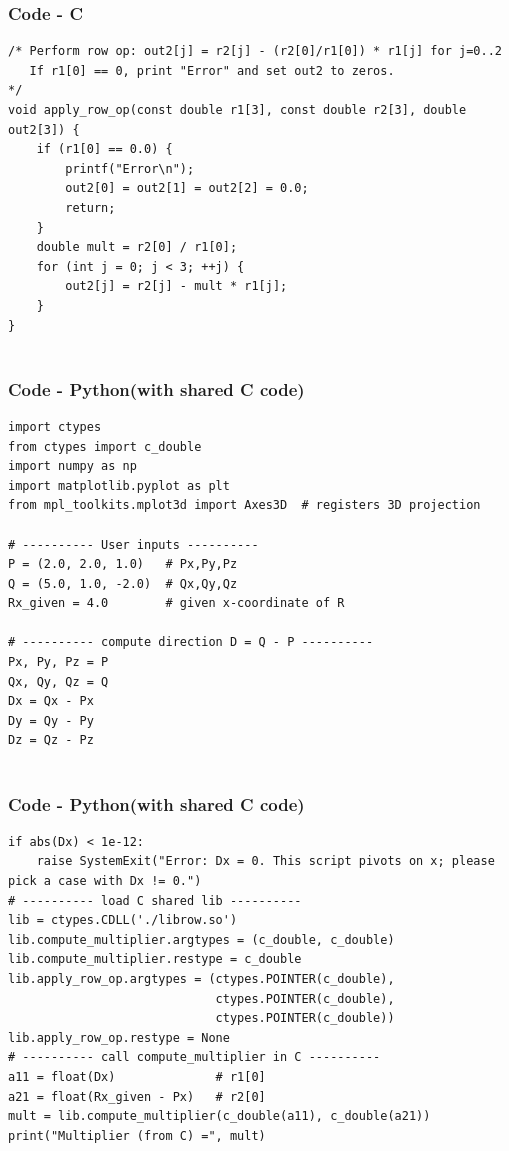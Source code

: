 \documentclass{beamer}
\theoremstyle{remark}
\numberwithin{equation}{section}
\begin{document}
\begin{frame}[fragile]
\frametitle{Code - C}
\begin{lstlisting}
/* Perform row op: out2[j] = r2[j] - (r2[0]/r1[0]) * r1[j] for j=0..2
   If r1[0] == 0, print "Error" and set out2 to zeros.
*/
void apply_row_op(const double r1[3], const double r2[3], double out2[3]) {
    if (r1[0] == 0.0) {
        printf("Error\n");
        out2[0] = out2[1] = out2[2] = 0.0;
        return;
    }
    double mult = r2[0] / r1[0];
    for (int j = 0; j < 3; ++j) {
        out2[j] = r2[j] - mult * r1[j];
    }
}


\end{lstlisting}
\end{frame}

\begin{frame}[fragile]
    \frametitle{Code - Python(with shared C code)}
    \begin{lstlisting}
import ctypes
from ctypes import c_double
import numpy as np
import matplotlib.pyplot as plt
from mpl_toolkits.mplot3d import Axes3D  # registers 3D projection

# ---------- User inputs ----------
P = (2.0, 2.0, 1.0)   # Px,Py,Pz
Q = (5.0, 1.0, -2.0)  # Qx,Qy,Qz
Rx_given = 4.0        # given x-coordinate of R

# ---------- compute direction D = Q - P ----------
Px, Py, Pz = P
Qx, Qy, Qz = Q
Dx = Qx - Px
Dy = Qy - Py
Dz = Qz - Pz


\end{lstlisting}
\end{frame}
\begin{frame}[fragile]
\frametitle{Code - Python(with shared C code)}
\begin{lstlisting}
if abs(Dx) < 1e-12:
    raise SystemExit("Error: Dx = 0. This script pivots on x; please pick a case with Dx != 0.")
# ---------- load C shared lib ----------
lib = ctypes.CDLL('./librow.so')
lib.compute_multiplier.argtypes = (c_double, c_double)
lib.compute_multiplier.restype = c_double
lib.apply_row_op.argtypes = (ctypes.POINTER(c_double),
                             ctypes.POINTER(c_double),
                             ctypes.POINTER(c_double))
lib.apply_row_op.restype = None
# ---------- call compute_multiplier in C ----------
a11 = float(Dx)              # r1[0]
a21 = float(Rx_given - Px)   # r2[0]
mult = lib.compute_multiplier(c_double(a11), c_double(a21))
print("Multiplier (from C) =", mult)

\end{lstlisting}
\end{frame}
\end{document}
